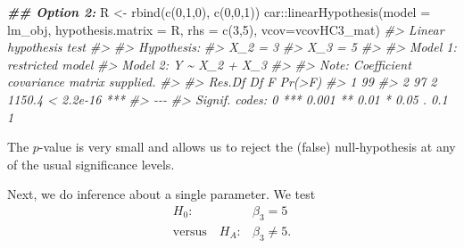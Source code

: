 \documentclass[
  14pt,
]{memoir}
\newenvironment{Shaded}{\begin{snugshade}}{\end{snugshade}}
\newcommand{\AttributeTok}[1]{\textcolor[rgb]{0.77,0.63,0.00}{#1}}
\newcommand{\CommentTok}[1]{\textcolor[rgb]{0.56,0.35,0.01}{\textit{#1}}}
\newcommand{\DecValTok}[1]{\textcolor[rgb]{0.00,0.00,0.81}{#1}}
\newcommand{\DocumentationTok}[1]{\textcolor[rgb]{0.56,0.35,0.01}{\textbf{\textit{#1}}}}
\newcommand{\FunctionTok}[1]{\textcolor[rgb]{0.00,0.00,0.00}{#1}}
\newcommand{\NormalTok}[1]{#1}
\newcommand{\OtherTok}[1]{\textcolor[rgb]{0.56,0.35,0.01}{#1}}
\newcommand{\SpecialCharTok}[1]{\textcolor[rgb]{0.00,0.00,0.00}{#1}}
\begin{document}
\begin{Shaded}
\begin{Highlighting}[]
\DocumentationTok{\#\# Option 2:}
\NormalTok{R }\OtherTok{\textless{}{-}} \FunctionTok{rbind}\NormalTok{(}\FunctionTok{c}\NormalTok{(}\DecValTok{0}\NormalTok{,}\DecValTok{1}\NormalTok{,}\DecValTok{0}\NormalTok{),}
           \FunctionTok{c}\NormalTok{(}\DecValTok{0}\NormalTok{,}\DecValTok{0}\NormalTok{,}\DecValTok{1}\NormalTok{))}
\NormalTok{car}\SpecialCharTok{::}\FunctionTok{linearHypothesis}\NormalTok{(}\AttributeTok{model =}\NormalTok{ lm\_obj, }
                      \AttributeTok{hypothesis.matrix =}\NormalTok{ R, }
                      \AttributeTok{rhs =} \FunctionTok{c}\NormalTok{(}\DecValTok{3}\NormalTok{,}\DecValTok{5}\NormalTok{),}
                      \AttributeTok{vcov=}\NormalTok{vcovHC3\_mat)}
\CommentTok{\#\textgreater{} Linear hypothesis test}
\CommentTok{\#\textgreater{} }
\CommentTok{\#\textgreater{} Hypothesis:}
\CommentTok{\#\textgreater{} X\_2 = 3}
\CommentTok{\#\textgreater{} X\_3 = 5}
\CommentTok{\#\textgreater{} }
\CommentTok{\#\textgreater{} Model 1: restricted model}
\CommentTok{\#\textgreater{} Model 2: Y \textasciitilde{} X\_2 + X\_3}
\CommentTok{\#\textgreater{} }
\CommentTok{\#\textgreater{} Note: Coefficient covariance matrix supplied.}
\CommentTok{\#\textgreater{} }
\CommentTok{\#\textgreater{}   Res.Df Df      F    Pr(\textgreater{}F)    }
\CommentTok{\#\textgreater{} 1     99                        }
\CommentTok{\#\textgreater{} 2     97  2 1150.4 \textless{} 2.2e{-}16 ***}
\CommentTok{\#\textgreater{} {-}{-}{-}}
\CommentTok{\#\textgreater{} Signif. codes:  0 \textquotesingle{}***\textquotesingle{} 0.001 \textquotesingle{}**\textquotesingle{} 0.01 \textquotesingle{}*\textquotesingle{} 0.05 \textquotesingle{}.\textquotesingle{} 0.1 \textquotesingle{} \textquotesingle{} 1}
\end{Highlighting}
\end{Shaded}

The \(p\)-value is very small and allows us to reject the (false) null-hypothesis at any of the usual significance levels.

Next, we do inference about a single parameter. We test
\begin{align*}
H_0:&\beta_3=5\\
\text{versus}\quad H_A:&\beta_3\neq 5.
\end{align*}
\end{document}
